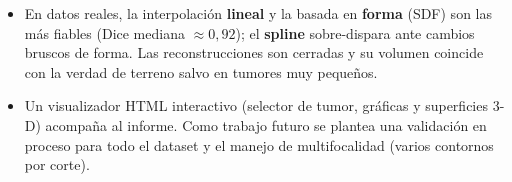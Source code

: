 \documentclass[conference]{IEEEtran}
\begin{document}
\begin{itemize}
        métricas, validados con un protocolo \emph{dejar-un-corte-fuera}
        sobre 110 casos reales de BraTS.
  \item En datos reales, la interpolación \textbf{lineal} y la basada en
        \textbf{forma} (SDF) son las más fiables (Dice mediana
        $\approx 0{,}92$); el \textbf{spline} sobre-dispara ante cambios
        bruscos de forma. Las reconstrucciones son cerradas y su volumen
        coincide con la verdad de terreno salvo en tumores muy pequeños.
  \item Un visualizador HTML interactivo (selector de tumor, gráficas y
        superficies 3-D) acompaña al informe. Como trabajo futuro se plantea
        una validación en proceso para todo el dataset y el manejo de
        multifocalidad (varios contornos por corte).
\end{itemize}
\end{document}
